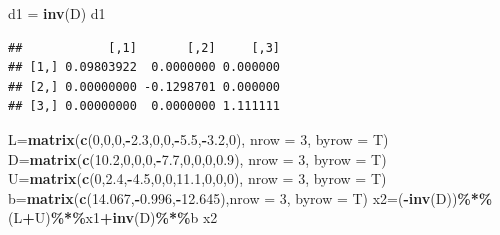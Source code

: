 \documentclass[
]{article}
\newenvironment{Shaded}{\begin{snugshade}}{\end{snugshade}}
\newcommand{\AttributeTok}[1]{\textcolor[rgb]{0.13,0.29,0.53}{#1}}
\newcommand{\DecValTok}[1]{\textcolor[rgb]{0.00,0.00,0.81}{#1}}
\newcommand{\FloatTok}[1]{\textcolor[rgb]{0.00,0.00,0.81}{#1}}
\newcommand{\FunctionTok}[1]{\textcolor[rgb]{0.13,0.29,0.53}{\textbf{#1}}}
\newcommand{\NormalTok}[1]{#1}
\newcommand{\OtherTok}[1]{\textcolor[rgb]{0.56,0.35,0.01}{#1}}
\newcommand{\SpecialCharTok}[1]{\textcolor[rgb]{0.81,0.36,0.00}{\textbf{#1}}}
\begin{document}
\begin{Shaded}
\begin{Highlighting}[]
\NormalTok{  d1 }\OtherTok{=} \FunctionTok{inv}\NormalTok{(D)}
\NormalTok{  d1}
\end{Highlighting}
\end{Shaded}

\begin{verbatim}
##            [,1]       [,2]     [,3]
## [1,] 0.09803922  0.0000000 0.000000
## [2,] 0.00000000 -0.1298701 0.000000
## [3,] 0.00000000  0.0000000 1.111111
\end{verbatim}

\begin{Shaded}
\begin{Highlighting}[]
\NormalTok{  L}\OtherTok{=}\FunctionTok{matrix}\NormalTok{(}\FunctionTok{c}\NormalTok{(}\DecValTok{0}\NormalTok{,}\DecValTok{0}\NormalTok{,}\DecValTok{0}\NormalTok{,}\SpecialCharTok{{-}}\FloatTok{2.3}\NormalTok{,}\DecValTok{0}\NormalTok{,}\DecValTok{0}\NormalTok{,}\SpecialCharTok{{-}}\FloatTok{5.5}\NormalTok{,}\SpecialCharTok{{-}}\FloatTok{3.2}\NormalTok{,}\DecValTok{0}\NormalTok{), }\AttributeTok{nrow =} \DecValTok{3}\NormalTok{, }\AttributeTok{byrow =}\NormalTok{ T)}
\NormalTok{  D}\OtherTok{=}\FunctionTok{matrix}\NormalTok{(}\FunctionTok{c}\NormalTok{(}\FloatTok{10.2}\NormalTok{,}\DecValTok{0}\NormalTok{,}\DecValTok{0}\NormalTok{,}\DecValTok{0}\NormalTok{,}\SpecialCharTok{{-}}\FloatTok{7.7}\NormalTok{,}\DecValTok{0}\NormalTok{,}\DecValTok{0}\NormalTok{,}\DecValTok{0}\NormalTok{,}\FloatTok{0.9}\NormalTok{), }\AttributeTok{nrow =} \DecValTok{3}\NormalTok{, }\AttributeTok{byrow =}\NormalTok{ T)}
\NormalTok{  U}\OtherTok{=}\FunctionTok{matrix}\NormalTok{(}\FunctionTok{c}\NormalTok{(}\DecValTok{0}\NormalTok{,}\FloatTok{2.4}\NormalTok{,}\SpecialCharTok{{-}}\FloatTok{4.5}\NormalTok{,}\DecValTok{0}\NormalTok{,}\DecValTok{0}\NormalTok{,}\FloatTok{11.1}\NormalTok{,}\DecValTok{0}\NormalTok{,}\DecValTok{0}\NormalTok{,}\DecValTok{0}\NormalTok{), }\AttributeTok{nrow =} \DecValTok{3}\NormalTok{, }\AttributeTok{byrow =}\NormalTok{ T)}
\NormalTok{  b}\OtherTok{=}\FunctionTok{matrix}\NormalTok{(}\FunctionTok{c}\NormalTok{(}\FloatTok{14.067}\NormalTok{,}\SpecialCharTok{{-}}\FloatTok{0.996}\NormalTok{,}\SpecialCharTok{{-}}\FloatTok{12.645}\NormalTok{),}\AttributeTok{nrow =} \DecValTok{3}\NormalTok{, }\AttributeTok{byrow =}\NormalTok{ T)}
\NormalTok{  x2}\OtherTok{=}\NormalTok{(}\SpecialCharTok{{-}}\FunctionTok{inv}\NormalTok{(D))}\SpecialCharTok{\%*\%}\NormalTok{(L}\SpecialCharTok{+}\NormalTok{U)}\SpecialCharTok{\%*\%}\NormalTok{x1}\SpecialCharTok{+}\FunctionTok{inv}\NormalTok{(D)}\SpecialCharTok{\%*\%}\NormalTok{b}
\NormalTok{  x2}
\end{Highlighting}
\end{Shaded}
\end{document}
